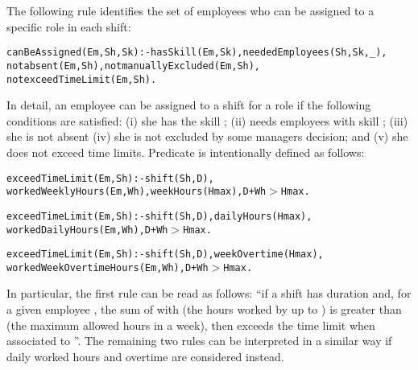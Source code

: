 \documentclass{tlp}
\begin{document}
The following rule identifies
the set of employees who can be assigned to a specific role in each shift:
\begin{alltt}\small
 canBeAssigned(Em,Sh,Sk) :- hasSkill(Em,Sk), neededEmployees(Sh,Sk,_),
    not absent(Em,Sh), not manuallyExcluded(Em,Sh),
    not exceedTimeLimit(Em,Sh).
\end{alltt}\normalsize
In detail, an employee  can be assigned to a shift  for a role 
if the following conditions are satisfied:
(i) she has the skill ;
(ii)  needs employees with skill ;
(iii) she is not absent
(iv) she is not excluded by some managers decision; and
(v) she does not exceed time limits.
Predicate  is intentionally defined as follows:

\begin{alltt}\small
 exceedTimeLimit(Em,Sh) :- shift(Sh,D),
    workedWeeklyHours(Em,Wh), weekHours(Hmax), D + Wh  \(>\) Hmax.

 exceedTimeLimit(Em,Sh) :- shift(Sh,D), dailyHours(Hmax),
    workedDailyHours(Em,Wh), D + Wh  \(>\) Hmax.

 exceedTimeLimit(Em,Sh) :- shift(Sh,D), weekOvertime(Hmax),
    workedWeekOvertimeHours(Em,Wh), D + Wh  \(>\) Hmax.
\end{alltt}\normalsize
In particular, the first rule can be read as follows:
``if a shift  has duration 
and, for a given employee , the sum of  with  (the hours worked by  up to )
is greater than  (the maximum allowed hours in a week),
then  exceeds the time limit when associated to ''.
The remaining two rules can be interpreted in a similar way if daily worked hours and overtime are
considered instead.
\end{document}

